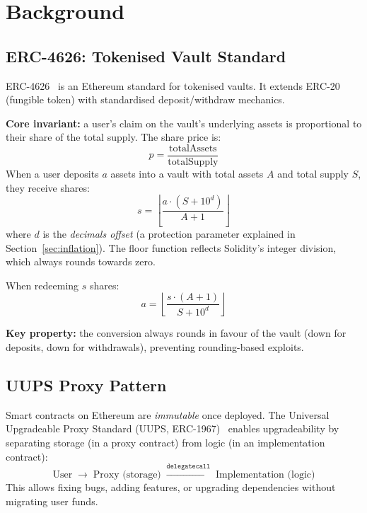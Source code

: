 \documentclass[12pt]{article}
\begin{document}
\section{Background}

\subsection{ERC-4626: Tokenised Vault Standard}

ERC-4626~\cite{eip4626} is an Ethereum standard for tokenised vaults.
It extends ERC-20 (fungible token) with standardised deposit/withdraw mechanics.

\textbf{Core invariant:} a user's claim on the vault's underlying assets is proportional to their share of the total supply.
The share price is:
\begin{equation}
  p = \frac{\text{totalAssets}}{\text{totalSupply}}
  \label{eq:share-price}
\end{equation}
When a user deposits $a$ assets into a vault with total assets $A$ and total supply $S$, they receive shares:
\begin{equation}
  s = \left\lfloor \frac{a \cdot (S + 10^d)}{A + 1} \right\rfloor
  \label{eq:deposit-shares}
\end{equation}
where $d$ is the \emph{decimals offset} (a protection parameter explained in Section~\ref{sec:inflation}).
The floor function reflects Solidity's integer division, which always rounds towards zero.

When redeeming $s$ shares:
\begin{equation}
  a = \left\lfloor \frac{s \cdot (A + 1)}{S + 10^d} \right\rfloor
  \label{eq:redeem-assets}
\end{equation}

\textbf{Key property:} the conversion always rounds in favour of the vault (down for deposits, down for withdrawals), preventing rounding-based exploits.

\subsection{UUPS Proxy Pattern}

Smart contracts on Ethereum are \emph{immutable} once deployed.
The Universal Upgradeable Proxy Standard (UUPS, ERC-1967)~\cite{erc1967} enables upgradeability by separating storage (in a proxy contract) from logic (in an implementation contract):
\[
  \text{User} \;\to\; \text{Proxy (storage)} \;\xrightarrow{\texttt{delegatecall}}\; \text{Implementation (logic)}
\]
This allows fixing bugs, adding features, or upgrading dependencies without migrating user funds.
\end{document}
